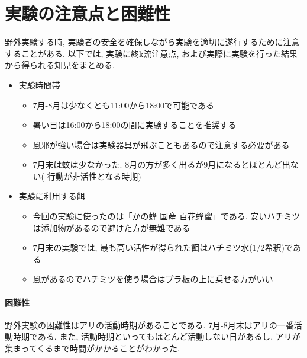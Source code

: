 ﻿\documentclass[a4paper, 12pt]{jsreport}
\begin{document}
\section{実験の注意点と困難性}
\label{sec:look}
野外実験する時, 実験者の安全を確保しながら実験を適切に遂行するために注意することがある. 以下では, 実験に終k流注意点, および実際に実験を行った結果から得られる知見をまとめる. 
\begin{itemize}
   \item 実験時間帯
   \begin{itemize}
     \item 7月-8月は少なくとも11:00から18:00で可能である
     \item 暑い日は16:00から18:00の間に実験することを推奨する
     \item 風邪が強い場合は実験器具が飛ぶこともあるので注意する必要がある
     \item 7月末は蚊は少なかった. 8月の方が多く出るが9月になるとほとんど出ない( 行動が非活性となる時期)
   \end{itemize}
   \item 実験に利用する餌
   \begin{itemize}
     \item 今回の実験に使ったのは「かの蜂 国産 百花蜂蜜」である. 安いハチミツは添加物があるので避けた方が無難である
     \item 7月末の実験では, 最も高い活性が得られた餌はハチミツ水(1/2希釈)である
     \item 風があるのでハチミツを使う場合はプラ板の上に乗せる方がいい
   \end{itemize}
 \end{itemize}
\paragraph{困難性}
野外実験の困難性はアリの活動時期があることである. 7月-8月末はアリの一番活動時期である. また, 活動時期といってもほとんど活動しない日があるし, アリが集まってくるまで時間がかかることがわかった. 
\end{document}
